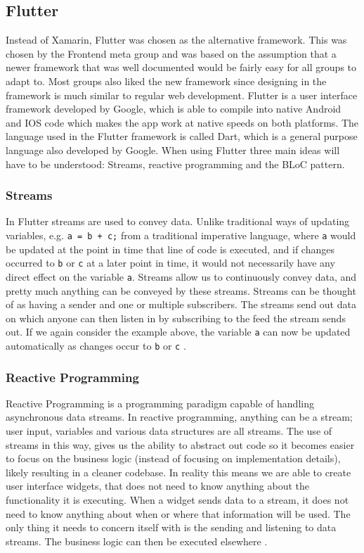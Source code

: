 \subsection{Flutter} \label{SEC:Flutter}
Instead of Xamarin, Flutter was chosen as the alternative framework.
This was chosen by the Frontend meta group and was based on the assumption that a newer framework that was well documented would be fairly easy for all groups to adapt to. 
Most groups also liked the new framework since designing in the framework is much similar to regular web development. 
Flutter is a user interface framework developed by Google, which is able to compile into native Android and IOS code which makes the app work at native speeds on both platforms. 
The language used in the Flutter framework is called Dart, which is a general purpose language also developed by Google.
When using Flutter three main ideas will have to be understood:
Streams, reactive programming and the BLoC pattern.

\subsubsection{Streams}
In Flutter streams are used to convey data.
Unlike traditional ways of updating variables, e.g. \lstinline$a = b + c;$ from a traditional imperative language, where \lstinline$a$ would be updated at the point in time that line of code is executed, and if changes occurred to \lstinline{b} or \lstinline{c} at a later point in time, it would not necessarily have any direct effect on the variable \lstinline$a$.
Streams allow us to continuously convey data, and pretty much anything can be conveyed by these streams.
Streams can be thought of as having a sender and one or multiple subscribers.
The streams send out data on which anyone can then listen in by subscribing to the feed the stream sends out.
If we again consider the example above, the variable \lstinline$a$ can now be updated automatically as changes occur to \lstinline$b$ or \lstinline$c$ \cite{Flutterintro}.
\subsubsection{Reactive Programming}
Reactive Programming is a programming paradigm capable of handling asynchronous data streams. 
In reactive programming, anything can be a stream; user input, variables and various data structures are all streams. 
The use of streams in this way, gives us the ability to abstract out code so it becomes easier to focus on the business logic (instead of focusing on implementation details), likely resulting in a cleaner codebase.
In reality this means we are able to create user interface widgets, that does not need to know anything about the functionality it is executing. 
When a widget sends data to a stream, it does not need to know anything about when or where that information will be used. 
The only thing it needs to concern itself with is the sending and listening to data streams. 
The business logic can then be executed elsewhere \cite{ReactiveProg}.
